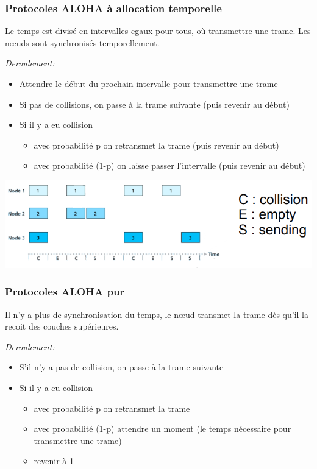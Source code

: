 \documentclass[a4paper, 12pt, french]{article}
\begin{document}
	\subsubsection{Protocoles ALOHA à allocation temporelle}

	Le temps est divisé en intervalles egaux pour tous, où transmettre une trame. Les nœuds sont synchronisés temporellement.

	\emph{Deroulement:}
	\begin{itemize}
		\item Attendre le début du prochain intervalle pour transmettre une trame
		\item Si pas de collisions, on passe à la trame suivante (puis revenir au début)
		\item Si il y a eu collision
		\begin{itemize}
			\item avec probabilité p on retransmet la trame (puis revenir au début)
			\item avec probabilité (1-p) on laisse passer l'intervalle (puis revenir au début)
		\end{itemize}
	\end{itemize}

	\includegraphics[width=13.8cm]{reseau_aloha}

	\subsubsection{Protocoles ALOHA pur}

	Il n'y a plus de synchronisation du temps, le nœud transmet la trame dès qu'il la recoit des couches supérieures.

	\emph{Deroulement:}
	\begin{itemize}
		\item S'il n'y a pas de collision, on passe à la trame suivante
		\item Si il y a eu collision
		\begin{itemize}
			\item avec probabilité p on retransmet la trame
			\item avec probabilité (1-p) attendre un moment (le temps nécessaire pour transmettre une trame)
			\item revenir à 1
		\end{itemize}
	\end{itemize}
\end{document}
